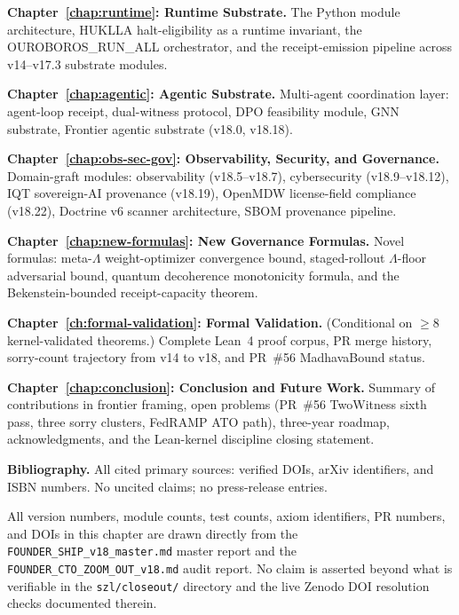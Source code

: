 \medskip

\textbf{Chapter~\ref{chap:runtime}: Runtime Substrate.}
The Python module architecture, HUKLLA halt-eligibility as a runtime
invariant, the OUROBOROS\_RUN\_ALL orchestrator, and the receipt-emission
pipeline across v14--v17.3 substrate modules.

\medskip

\textbf{Chapter~\ref{chap:agentic}: Agentic Substrate.}
Multi-agent coordination layer: agent-loop receipt, dual-witness protocol,
DPO feasibility module, GNN substrate, Frontier agentic substrate
(v18.0, v18.18).

\medskip

\textbf{Chapter~\ref{chap:obs-sec-gov}: Observability, Security, and Governance.}
Domain-graft modules: observability (v18.5--v18.7), cybersecurity
(v18.9--v18.12), IQT sovereign-AI provenance (v18.19), OpenMDW
license-field compliance (v18.22), Doctrine v6 scanner architecture,
SBOM provenance pipeline.

\medskip

\textbf{Chapter~\ref{chap:new-formulas}: New Governance Formulas.}
Novel formulas: meta-\(\Lambda\) weight-optimizer convergence bound,
staged-rollout \(\Lambda\)-floor adversarial bound, quantum decoherence
monotonicity formula, and the Bekenstein-bounded receipt-capacity theorem.

\medskip

\textbf{Chapter~\ref{ch:formal-validation}: Formal Validation.}
(Conditional on $\geq 8$ kernel-validated theorems.)
Complete Lean~4 proof corpus, PR merge history, sorry-count trajectory
from v14 to v18, and PR~\#56 MadhavaBound status.

\medskip

\textbf{Chapter~\ref{chap:conclusion}: Conclusion and Future Work.}
Summary of contributions in frontier framing, open problems (PR~\#56
TwoWitness sixth pass, three sorry clusters, FedRAMP ATO path), three-year
roadmap, acknowledgments, and the Lean-kernel discipline closing statement.

\medskip

\textbf{Bibliography.}
All cited primary sources: verified DOIs, arXiv identifiers, and ISBN
numbers.
No uncited claims; no press-release entries.

\bigskip

\begin{remark}
All version numbers, module counts, test counts, axiom identifiers, PR
numbers, and DOIs in this chapter are drawn directly from the
\texttt{FOUNDER\_SHIP\_v18\_master.md} master report and the
\texttt{FOUNDER\_CTO\_ZOOM\_OUT\_v18.md} audit report.
No claim is asserted beyond what is verifiable in the
\texttt{szl/closeout/} directory and the live Zenodo DOI resolution
checks documented therein.
\end{remark}
